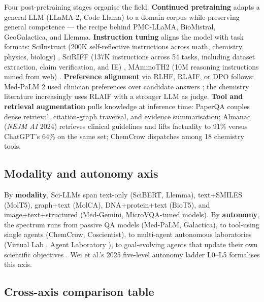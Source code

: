 \documentclass{article}
\begin{document}
Four post-pretraining stages organise the field. \textbf{Continued pretraining} adapts a general LLM (LLaMA-2, Code Llama) to a domain corpus while preserving general competence --- the recipe behind PMC-LLaMA, BioMistral, GeoGalactica, and Llemma. \textbf{Instruction tuning} aligns the model with task formats: SciInstruct (200K self-reflective instructions across math, chemistry, physics, biology) \cite{zhang2024sciinstructaselfre}, SciRIFF (137K instructions across 54 tasks, including dataset extraction, claim verification, and IE) \cite{wadden2024sciriffaresourceto}, MAmmoTH2 (10M reasoning instructions mined from web) \cite{yue2024mammoth2scalingins}. \textbf{Preference alignment} via RLHF, RLAIF, or DPO follows: Med-PaLM 2 used clinician preferences over candidate answers \cite{singhal2025towardexpertlevelm}; the chemistry literature \cite{ramos2024chemicalscience202} increasingly uses RLAIF with a stronger LLM as judge. \textbf{Tool and retrieval augmentation} pulls knowledge at inference time: PaperQA \cite{ala2023arxiv2312075592023} couples dense retrieval, citation-graph traversal, and evidence summarisation; Almanac (\emph{NEJM AI} 2024) \cite{zakka2024almanacretrievalau} retrieves clinical guidelines and lifts factuality to 91\% versus ChatGPT's 64\% on the same set; ChemCrow \cite{bran2024naturemachineintel} dispatches among 18 chemistry tools.

\subsection{Modality and autonomy axis}\label{modality-and-autonomy-axis}

By \textbf{modality}, Sci-LLMs span text-only (SciBERT, Llemma), text+SMILES (MolT5), graph+text (MolCA), DNA+protein+text (BioT5), and image+text+structured (Med-Gemini, MicroVQA-tuned models). By \textbf{autonomy}, the spectrum runs from passive QA models (Med-PaLM, Galactica), to tool-using single agents (ChemCrow, Coscientist), to multi-agent autonomous laboratories (Virtual Lab \cite{swanson2024thevirtuallabaiage}, Agent Laboratory \cite{schmidgall2025agentlaboratoryusi}), to goal-evolving agents that update their own scientific objectives \cite{du2025acceleratingscient}. Wei et al.'s 2025 five-level autonomy ladder L0--L5 \cite{wei2025fromaiforscienceto} formalises this axis.

\subsection{Cross-axis comparison table}\label{cross-axis-comparison-table}
\end{document}

